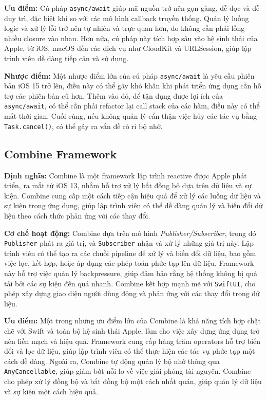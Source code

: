 \textbf{Ưu điểm:} Cú pháp \texttt{async/await} giúp mã nguồn trở nên gọn gàng, dễ đọc và dễ duy trì, đặc biệt khi so với các mô hình callback truyền thống. Quản lý luồng logic và xử lý lỗi trở nên tự nhiên và trực quan hơn, do không cần phải lồng nhiều closure vào nhau. Hơn nữa, cú pháp này tích hợp sâu vào hệ sinh thái của Apple, từ iOS, macOS đến các dịch vụ như CloudKit và URLSession, giúp lập trình viên dễ dàng tiếp cận và sử dụng.

\textbf{Nhược điểm:} Một nhược điểm lớn của cú pháp \texttt{async/await} là yêu cầu phiên bản iOS 15 trở lên, điều này có thể gây khó khăn khi phát triển ứng dụng cần hỗ trợ các phiên bản cũ hơn. Thêm vào đó, để tận dụng được lợi ích của \texttt{async/await}, có thể cần phải refactor lại call stack của các hàm, điều này có thể mất thời gian. Cuối cùng, nếu không quản lý cẩn thận việc hủy các tác vụ bằng \texttt{Task.cancel()}, có thể gây ra vấn đề rò rỉ bộ nhớ.
\subsection{Combine Framework}
\textbf{Định nghĩa:} Combine là một framework lập trình reactive được Apple phát triển, ra mắt từ iOS 13, nhằm hỗ trợ xử lý bất đồng bộ dựa trên dữ liệu và sự kiện. Combine cung cấp một cách tiếp cận hiệu quả để xử lý các luồng dữ liệu và sự kiện trong ứng dụng, giúp lập trình viên có thể dễ dàng quản lý và biến đổi dữ liệu theo cách thức phản ứng với các thay đổi.

\textbf{Cơ chế hoạt động:} Combine dựa trên mô hình \textit{Publisher/Subscriber}, trong đó \texttt{Publisher} phát ra giá trị, và \texttt{Subscriber} nhận và xử lý những giá trị này. Lập trình viên có thể tạo ra các chuỗi pipeline để xử lý và biến đổi dữ liệu, bao gồm việc lọc, kết hợp, hoặc áp dụng các phép toán phức tạp lên dữ liệu. Framework này hỗ trợ việc quản lý backpressure, giúp đảm bảo rằng hệ thống không bị quá tải bởi các sự kiện đến quá nhanh. Combine kết hợp mạnh mẽ với \texttt{SwiftUI}, cho phép xây dựng giao diện người dùng động và phản ứng với các thay đổi trong dữ liệu.

\textbf{Ưu điểm:} Một trong những ưu điểm lớn của Combine là khả năng tích hợp chặt chẽ với Swift và toàn bộ hệ sinh thái Apple, làm cho việc xây dựng ứng dụng trở nên liền mạch và hiệu quả. Framework cung cấp hàng trăm operators hỗ trợ biến đổi và lọc dữ liệu, giúp lập trình viên có thể thực hiện các tác vụ phức tạp một cách dễ dàng. Ngoài ra, Combine tự động quản lý bộ nhớ thông qua \texttt{AnyCancellable}, giúp giảm bớt nỗi lo về việc giải phóng tài nguyên. Combine cho phép xử lý đồng bộ và bất đồng bộ một cách nhất quán, giúp quản lý dữ liệu và sự kiện một cách hiệu quả.

